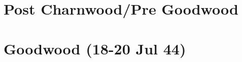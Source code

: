 \documentclass[noraggedright]{turabian-researchpaper}
\begin{document}
\section{Post Charnwood/Pre Goodwood}









\section{Goodwood (18-20 Jul 44)}


\end{document}
